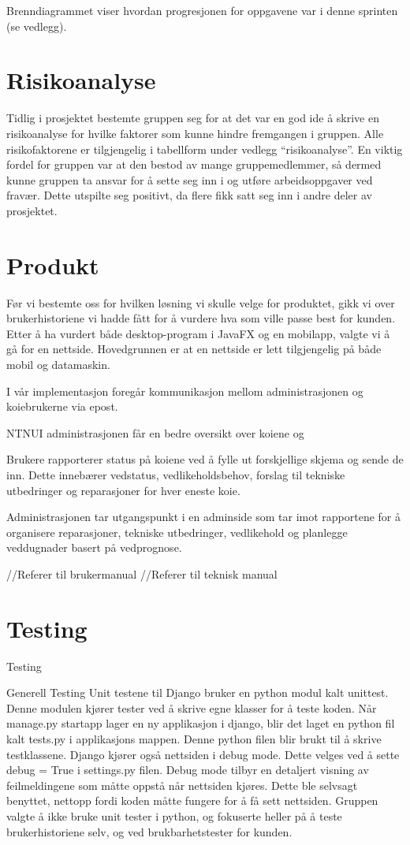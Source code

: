\documentclass[12pt,a4paper,norsk]{article}
\begin{document}
Brenndiagrammet viser hvordan progresjonen for oppgavene var i denne sprinten (se vedlegg).

	
	\section{Risikoanalyse}
	Tidlig i prosjektet bestemte gruppen seg for at det var en god ide å skrive en risikoanalyse for hvilke faktorer som kunne hindre fremgangen i gruppen. Alle risikofaktorene er tilgjengelig i tabellform under vedlegg “risikoanalyse”. En viktig fordel for gruppen var at den bestod av mange gruppemedlemmer, så dermed kunne gruppen ta ansvar for å sette seg inn i og utføre arbeidsoppgaver ved fravær. Dette utspilte seg positivt, da flere fikk satt seg inn i andre deler av prosjektet.
	
	\section{Produkt}
	Før vi bestemte oss for hvilken løsning vi skulle velge for produktet, gikk vi over brukerhistoriene vi hadde fått for å vurdere hva som ville passe best for kunden. Etter å ha vurdert både desktop-program i JavaFX og en mobilapp, valgte vi å gå for en nettside. Hovedgrunnen er at en nettside er lett tilgjengelig på både mobil og datamaskin.
	
	I vår implementasjon foregår kommunikasjon mellom administrasjonen og koiebrukerne via epost.

    NTNUI administrasjonen får en bedre oversikt over koiene og
    
    Brukere rapporterer status på koiene ved å fylle ut forskjellige skjema og sende de inn. Dette innebærer vedstatus, vedlikeholdsbehov, forslag til tekniske utbedringer og reparasjoner for hver eneste koie.
    
    Administrasjonen tar utgangspunkt i en adminside som tar imot rapportene for å organisere reparasjoner, tekniske utbedringer, vedlikehold og planlegge veddugnader basert på vedprognose.
    
	
	//Referer til brukermanual
	//Referer til teknisk manual
	
	\section{Testing}
	Testing

Generell Testing
Unit testene til Django bruker en python modul kalt unittest. Denne modulen kjører tester ved å skrive egne klasser for å teste koden. Når manage.py startapp lager en ny applikasjon i django, blir det laget en python fil kalt tests.py i applikasjons mappen. Denne python filen blir brukt til å skrive testklassene. Django kjører også nettsiden i debug mode. Dette velges ved å sette debug = True i settings.py filen. Debug mode tilbyr en detaljert visning av feilmeldingene som måtte oppstå når nettsiden kjøres. Dette ble selvsagt benyttet, nettopp fordi koden måtte fungere for å få sett nettsiden. Gruppen valgte å ikke bruke unit tester i python, og fokuserte heller på å teste brukerhistoriene selv, og ved brukbarhetstester for kunden.
\end{document}

